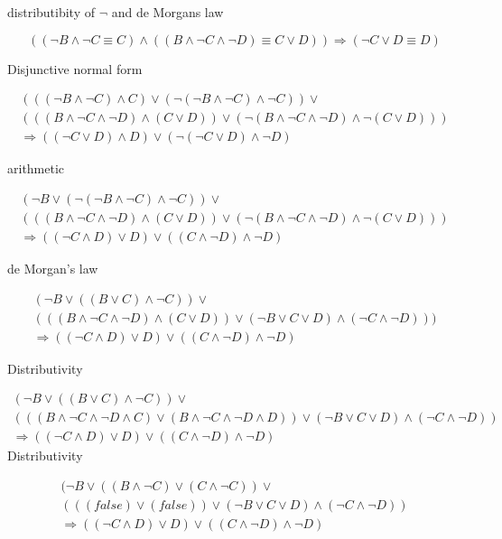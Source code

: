\documentclass[10pt,a4paper]{article}
\newcommand{\en}{\wedge}
\newcommand{\of}{\vee}
\begin{document}
distributibity of $\neg$ and de Morgans law

\begin{equation}
 ((\neg B\wedge \neg C \equiv C)\wedge((B\wedge \neg C\wedge \neg D) \equiv C \vee D)) \Rightarrow (\neg C \vee D \equiv D)
\end{equation}

Disjunctive normal form

\begin{multline}
 (((\neg B \wedge \neg C)\wedge C)\vee(\neg(\neg B \wedge \neg C)\wedge\neg C))\vee \\
 (((B \wedge \neg C \wedge \neg D)\wedge (C\vee D))\vee (\neg(B\wedge\neg C\wedge\neg D)\wedge\neg(C\vee D)))  \\ \Rightarrow((\neg C \vee D)\wedge D)\vee(\neg(\neg C\vee D)\wedge\neg D) 
\end{multline}

arithmetic

\begin{multline}
 (\neg B\vee(\neg(\neg B \wedge \neg C)\wedge\neg C))\vee \\
 (((B \wedge \neg C \wedge \neg D)\wedge (C\vee D))\vee(\neg(B\wedge\neg C\wedge\neg D)\wedge\neg(C\vee D)))  \\ \Rightarrow((\neg C \wedge D)\vee D)\vee((C\wedge \neg D)\en\neg D) 
\end{multline}

de Morgan's law

\begin{multline}
 (\neg B\vee(( B \vee C)\wedge\neg C))\vee \\
 (((B \wedge \neg C \wedge \neg D)\wedge (C\vee D))\vee (\neg B\vee C\vee D)\wedge(\neg C\wedge\neg D)))  \\ \Rightarrow((\neg C \wedge D)\vee D)\vee((C\wedge \neg D)\en\neg D) 
\end{multline}

Distributivity

\begin{multline}
 (\neg B\vee(( B \vee C)\wedge\neg C))\vee \\
 (((B\en\neg C\en\neg D\en C)\of(B\en \neg C\en\neg D\en D))\vee (\neg B\vee C\vee D)\wedge(\neg C\wedge\neg D))  \\ \Rightarrow((\neg C \wedge D)\vee D)\vee((C\wedge \neg D)\en\neg D) 
\end{multline}
Distributivity

\begin{multline}
 (\neg B\vee(( B \wedge \neg C)\vee(C\wedge\neg C))\vee \\
 (((false)\of(false))\vee (\neg B\vee C\vee D)\wedge(\neg C\wedge\neg D))  \\ \Rightarrow((\neg C \wedge D)\vee D)\vee((C\wedge \neg D)\en\neg D) 
\end{multline}
\end{document}
